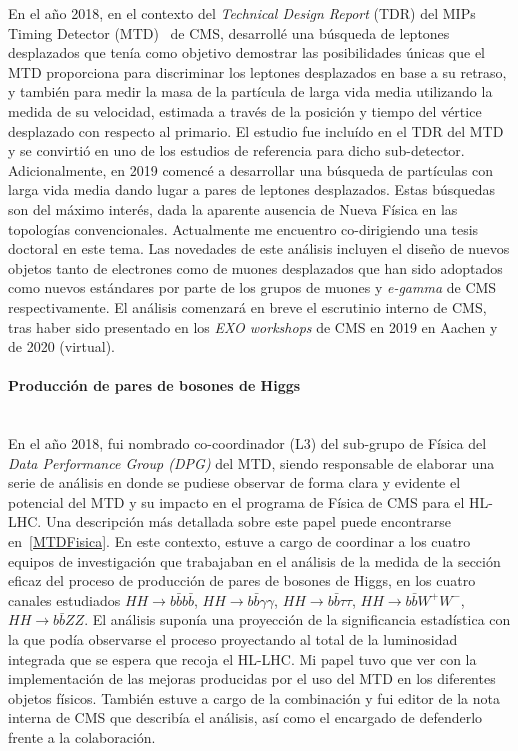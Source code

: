 En el año 2018, en el contexto del \emph{Technical Design Report} (TDR) del MIPs Timing Detector (MTD)~\cite{MTDTDR} de CMS, desarrollé una búsqueda de leptones desplazados que tenía como objetivo demostrar las posibilidades únicas que el MTD proporciona para discriminar los leptones desplazados en base a su retraso, y también para medir la masa de la partícula de larga vida media utilizando la medida de su velocidad, estimada a través de la posición y tiempo del vértice desplazado con respecto al primario. El estudio fue incluído en el TDR del MTD y se convirtió en uno de los estudios de referencia para dicho sub-detector. Adicionalmente, en 2019 comencé a desarrollar una búsqueda de partículas con larga vida media dando lugar a pares de leptones desplazados. Estas búsquedas son del máximo interés, dada la aparente ausencia de Nueva Física en las topologías convencionales. Actualmente me encuentro co-dirigiendo una tesis doctoral en este tema. Las novedades de este análisis incluyen el diseño de nuevos objetos tanto de electrones como de muones desplazados que han sido adoptados como nuevos estándares por parte de los grupos de muones y \emph{e-gamma} de CMS respectivamente. El análisis comenzará en breve el escrutinio interno de CMS, tras haber sido presentado en los \emph{EXO workshops} de CMS en 2019 en Aachen y de 2020 (virtual).

\paragraph{Producción de pares de bosones de Higgs\\\\}

En el año 2018, fui nombrado co-coordinador (L3) del sub-grupo de Física del \emph{Data Performance Group (DPG)} del MTD, siendo responsable de elaborar una serie de análisis en donde se pudiese observar de forma clara y evidente el potencial del MTD y su impacto en el programa de Física de CMS para el HL-LHC. Una descripción más detallada sobre este papel puede encontrarse en~\ref{MTDFisica}. En este contexto, estuve a cargo de coordinar a los cuatro equipos de investigación que trabajaban en el análisis de la medida de la sección eficaz del proceso de producción de pares de bosones de Higgs, en los cuatro canales estudiados $HH\rightarrow b\bar{b}b\bar{b}$, $HH\rightarrow b\bar{b}\gamma\gamma$, $HH\rightarrow b\bar{b}\tau\tau$, $HH\rightarrow b\bar{b}W^{+}W^{-}$, $HH\rightarrow b\bar{b}ZZ$. El análisis suponía una proyección de la significancia estadística con la que podía observarse el proceso proyectando al total de la luminosidad integrada que se espera que recoja el HL-LHC. Mi papel tuvo que ver con la implementación de las mejoras producidas por el uso del MTD en los diferentes objetos físicos. También estuve a cargo de la combinación y fui editor de la nota interna de CMS que describía el análisis, así como el encargado de defenderlo frente a la colaboración.


